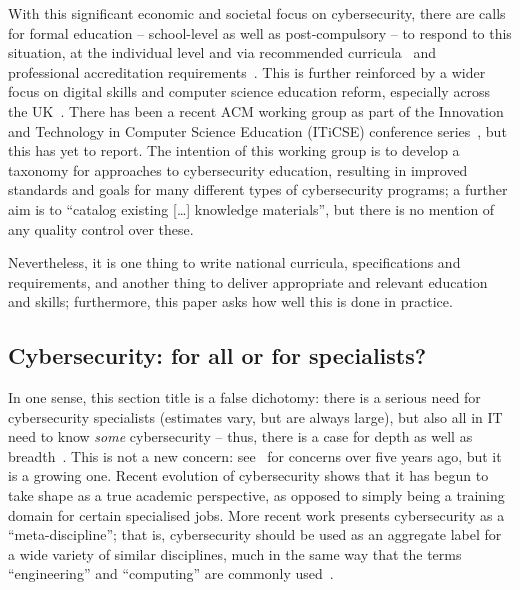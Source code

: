 \documentclass[conference]{IEEEtran}
\begin{document}
With this significant economic and societal focus on cybersecurity, there are calls for formal education -- school-level as well as post-compulsory -- to respond to this situation, at the individual level and via recommended curricula~\cite{mcgettrick-et-al:sigcse2014,ACM2017b} and professional accreditation requirements~\cite{BCS2018a}. This is further reinforced by a wider focus on digital skills and computer science education reform, especially across the UK~\cite{brown-et-al:toce2014,murphy-et-al:programming2017,tryfonas+crick:petra2018}. There has been a recent ACM working group as part of the Innovation and Technology in Computer Science Education (ITiCSE) conference series~\cite{Parrishetal2018a}, but this has yet to report. The intention of this working group is to develop a taxonomy for approaches to cybersecurity education, resulting in improved standards and goals for many different types of cybersecurity programs; a further aim is to ``catalog existing [\dots] knowledge materials'', but there is no mention of any quality control over these.

Nevertheless, it is one thing to write national curricula, specifications and requirements, and
another thing to deliver appropriate and relevant education and skills; furthermore, this paper asks how well this is done in practice.

\subsection{Cybersecurity: for all or for specialists?}

In one sense, this section title is a false dichotomy: there is a serious need for cybersecurity specialists (estimates vary, but are always large), but also all in IT need to know \emph{some} cybersecurity -- thus, there is a case for depth as well as breadth~\cite{manson+pike:2014}. This is not a new concern: see~\cite{Parr2014a} for concerns over five years ago, but it is a growing one. Recent evolution of cybersecurity shows that it has begun to take shape as a true academic perspective, as opposed to simply being a training domain for certain specialised jobs. More recent work presents cybersecurity as a ``meta-discipline''; that is, cybersecurity should be used as an aggregate label for a wide variety of similar disciplines, much in the same way that the terms ``engineering'' and ``computing'' are commonly used~\cite{Parrishetal2018b}. 
\end{document}

